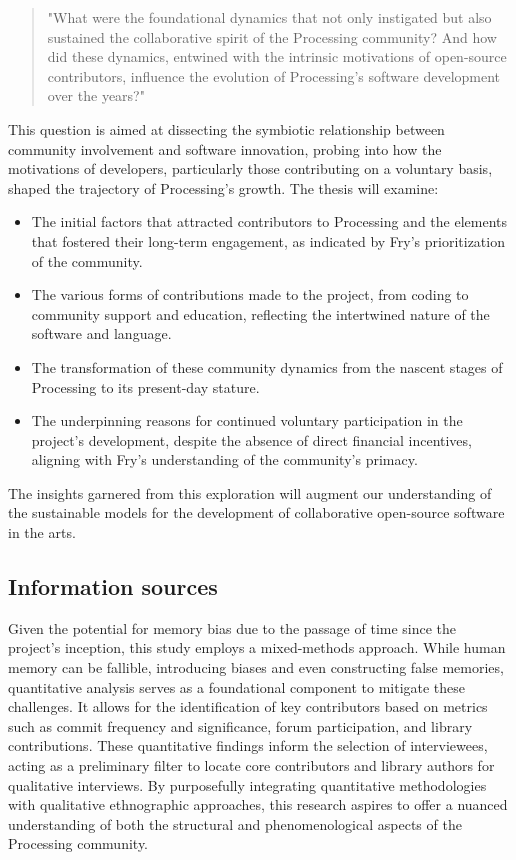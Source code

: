 \begin{quote}
"What were the foundational dynamics that not only instigated but also sustained the collaborative spirit of the Processing community? And how did these dynamics, entwined with the intrinsic motivations of open-source contributors, influence the evolution of Processing's software development over the years?"
\end{quote}

This question is aimed at dissecting the symbiotic relationship between community involvement and software innovation, probing into how the motivations of developers, particularly those contributing on a voluntary basis, shaped the trajectory of Processing's growth. The thesis will examine:

\begin{itemize}
\item The initial factors that attracted contributors to Processing and the elements that fostered their long-term engagement, as indicated by Fry's prioritization of the community.
\item The various forms of contributions made to the project, from coding to community support and education, reflecting the intertwined nature of the software and language.
\item The transformation of these community dynamics from the nascent stages of Processing to its present-day stature.
\item The underpinning reasons for continued voluntary participation in the project's development, despite the absence of direct financial incentives, aligning with Fry's understanding of the community's primacy.
\end{itemize}

The insights garnered from this exploration will augment our understanding of the sustainable models for the development of collaborative open-source software in the arts.

\subsection{Information sources}

Given the potential for memory bias due to the passage of time since the project's inception, this study employs a mixed-methods approach. While human memory can be fallible, introducing biases and even constructing false memories, quantitative analysis serves as a foundational component to mitigate these challenges. It allows for the identification of key contributors based on metrics such as commit frequency and significance, forum participation, and library contributions. These quantitative findings inform the selection of interviewees, acting as a preliminary filter to locate core contributors and library authors for qualitative interviews.
By purposefully integrating quantitative methodologies with qualitative ethnographic approaches, this research aspires to offer a nuanced understanding of both the structural and phenomenological aspects of the Processing community.

